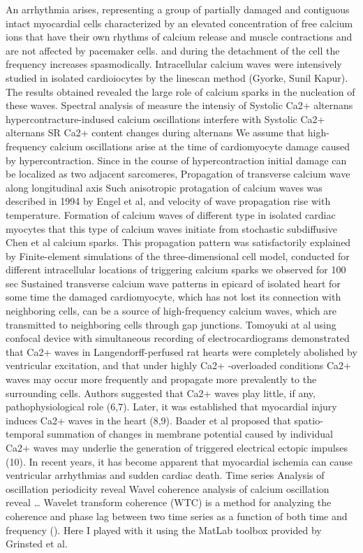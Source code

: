 \documentclass[a4paper,12pt]{article}
\begin{document}
An arrhythmia arises, representing a group of partially damaged and contiguous intact myocardial cells characterized by an elevated concentration of free calcium ions that have their own rhythms of calcium release and muscle contractions and are not affected by pacemaker cells.
and during the detachment of the cell the frequency increases spasmodically.
Intracellular calcium waves were intensively studied in isolated cardioiocytes by the linescan method (Gyorke, Sunil Kapur).
The results obtained revealed the large role of calcium sparks in the nucleation of these waves.
Spectral analysis of
 measure the intensiy of Systolic Ca2+ alternans
hypercontracture-indused calcium oscillations interfere with Systolic Ca2+ alternans
SR Ca2+ content changes during alternans \cite{diaz2004sarcoplasmic}
We assume that high-frequency calcium oscillations arise at the time of cardiomyocyte damage caused by hypercontraction.
Since in the course of hypercontraction initial damage can be localized as two adjacent sarcomeres,
Propagation of transverse calcium wave along longitudinal axis
Such anisotropic protagation of calcium waves was described in 1994 by Engel et al, and velocity of wave propagation rise with temperature.
Formation of calcium waves of different type in isolated cardiac myocytes \cite{ishida1999formation}
that this type of calcium waves initiate from stochastic \cite{izu2001evolution} subdiffusive  \cite{chen2014ryanodine} Chen et al  calcium sparks.
This propagation pattern was satisfactorily explained by Finite-element simulations of the three-dimensional cell model, conducted for different intracellular locations of triggering calcium sparks \cite{tracqui2009integrated}
we observed for 100 sec Sustained transverse calcium wave patterns in epicard of isolated heart
for some time the damaged cardiomyocyte, which has not lost its connection with neighboring cells, can be a source of high-frequency calcium waves, which are transmitted to neighboring cells through gap junctions.
Tomoyuki at al using confocal device with simultaneous recording of electrocardiograms demonstrated that Ca2+ waves in Langendorff-perfused rat hearts were completely abolished by ventricular excitation, and that under highly Ca2+ -overloaded conditions Ca2+ waves may occur more frequently and propagate more prevalently to the surrounding cells. Authors suggested that Ca2+ waves play little, if any, pathophysiological role (6,7). Later, it was established that myocardial injury induces Ca2+ waves in the heart (8,9). Baader et al proposed that spatio-temporal summation of changes in membrane potential caused by individual Ca2+ waves may underlie the generation of triggered electrical ectopic impulses (10).
In recent years, it has become apparent that myocardial ischemia can cause ventricular arrhythmias and sudden cardiac death.
Time series
Analysis of oscillation periodicity reveal
Wavel coherence analysis of calcium oscillation reveal …
Wavelet transform coherence (WTC) is a method for analyzing the coherence and phase lag between two time series as a function of both time and frequency (\cite{chang2010time}).
Here I played with it using the MatLab toolbox provided by Grinsted et al.
\end{document}
